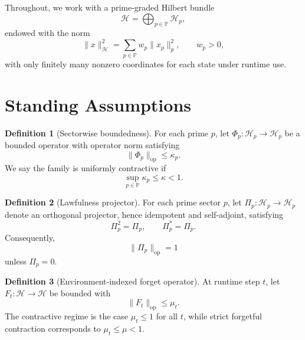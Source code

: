 \documentclass[12pt,a4paper]{article}
\theoremstyle{definition}
\newtheorem{definition}{Definition}[section]
\theoremstyle{plain}
\theoremstyle{remark}
\begin{document}
Throughout, we work with a prime-graded Hilbert bundle
\begin{equation}
\mathcal{H} = \bigoplus_{p\in\mathbb{P}} \mathcal{H}_p,
\end{equation}
endowed with the norm
\begin{equation}
\|x\|_{\mathcal{H}}^2 = \sum_{p\in\mathbb{P}} w_p \|x_p\|_p^2,
\qquad w_p > 0,
\end{equation}
with only finitely many nonzero coordinates for each state under runtime use.

\section{Standing Assumptions}

\begin{definition}[Sectorwise boundedness]
For each prime $p$, let $\Phi_p : \mathcal{H}_p \to \mathcal{H}_p$ be a bounded
operator with operator norm satisfying
\begin{equation}
\|\Phi_p\|_{\mathrm{op}} \le \kappa_p.
\end{equation}
We say the family is uniformly contractive if
\begin{equation}
\sup_{p\in\mathbb{P}} \kappa_p \le \kappa < 1.
\end{equation}
\end{definition}

\begin{definition}[Lawfulness projector]
For each prime sector $p$, let $\Pi_p : \mathcal{H}_p \to \mathcal{H}_p$ denote
an orthogonal projector, hence idempotent and self-adjoint, satisfying
\begin{equation}
\Pi_p^2 = \Pi_p, \qquad \Pi_p^* = \Pi_p.
\end{equation}
Consequently,
\begin{equation}
\|\Pi_p\|_{\mathrm{op}} = 1
\end{equation}
unless $\Pi_p = 0$.
\end{definition}

\begin{definition}[Environment-indexed forget operator]
At runtime step $t$, let $F_t : \mathcal{H} \to \mathcal{H}$ be bounded with
\begin{equation}
\|F_t\|_{\mathrm{op}} \le \mu_t.
\end{equation}
The contractive regime is the case $\mu_t \le 1$ for all $t$, while strict
forgetful contraction corresponds to $\mu_t \le \mu < 1$.
\end{definition}
\end{document}

